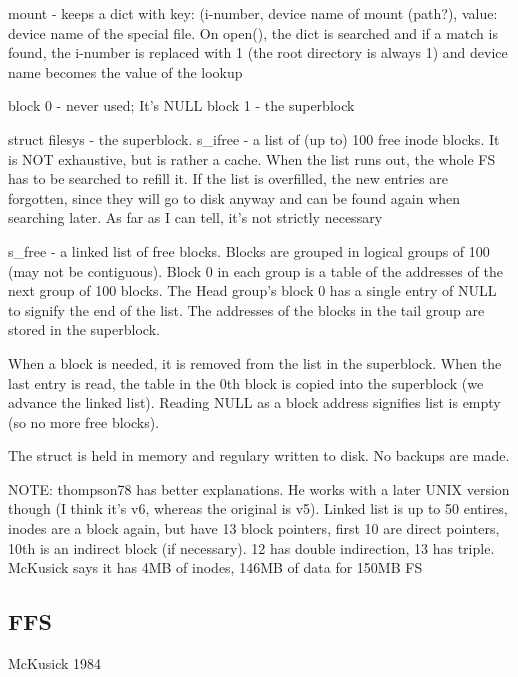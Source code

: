\documentclass[a4paper]{article}
\begin{document}
        mount - keeps a dict with key: (i-number, device name of mount (path?),
        value: device name of the special file. On open(), the dict is searched
        and if a match is found, the i-number is replaced with 1 (the root
        directory is always 1) and device name becomes the value of the lookup

        block 0 - never used; It's NULL
        block 1 - the superblock

        struct filesys - the superblock.
            s\_ifree - a list of (up to) 100 free inode blocks. It is NOT
            exhaustive, but is rather a cache. When the list runs out, the
            whole FS has to be searched to refill it. If the list is
            overfilled, the new entries are forgotten, since they will go to
            disk anyway and can be found again when searching later.
            As far as I can tell, it's not strictly necessary

            s\_free - a linked list of free blocks.  Blocks are grouped in
            logical groups of 100 (may not be contiguous). Block 0 in each
            group is a table of the addresses of the next group of 100 blocks.
            The Head group's block 0 has a single entry of NULL to signify the
            end of the list. The addresses of the blocks in the tail group are
            stored in the superblock.

            When a block is needed, it is removed from the list in the
            superblock. When the last entry is read, the table in the 0th block
            is copied into the superblock (we advance the linked list). Reading
            NULL as a block address signifies list is empty (so no more free
            blocks).

            The struct is held in memory and regulary written to disk. No
            backups are made.

            NOTE: thompson78 has better explanations. He works with a later
            UNIX version though (I think it's v6, whereas the original is v5).
            Linked list is up to 50 entires, inodes are a block again, but have
            13 block pointers, first 10 are direct pointers, 10th is an
            indirect block (if necessary). 12 has double indirection, 13 has
            triple.
            McKusick says it has 4MB of inodes, 146MB of data for 150MB FS

    \subsection{FFS}
        McKusick 1984
\end{document}
